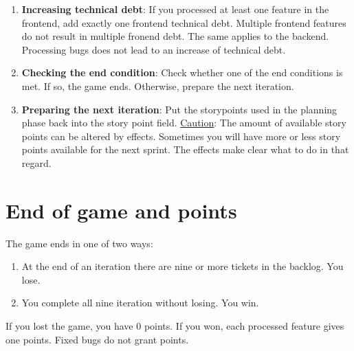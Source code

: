 \documentclass[a4paper, 11pt]{scrartcl}
\begin{document}
\begin{enumerate}
\begin{itemize}
    \end{itemize}
    \item \textbf{Increasing technical debt}: If you processed at least one feature in the frontend, add exactly one frontend technical debt. Multiple frontend features do not result in multiple fronend debt. The same applies to the backend. Processing bugs does not lead to an increase of technical debt.
    \item \textbf{Checking the end condition}: Check whether one of the end conditions is met. If so, the game ends. Otherwise, prepare the next iteration.
    \item \textbf{Preparing the next iteration}: Put the storypoints used in the planning phase back into the story point field. \underline{Caution}: The amount of available story points can be altered by effects. Sometimes you will have more or less story points available for the next sprint. The effects make clear what to do in that regard.
\end{enumerate}

\section*{End of game and points}

The game ends in one of two ways:

\begin{enumerate}
    \item At the end of an iteration there are nine or more tickets in the backlog. You lose.
    \item You complete all nine iteration without losing. You win.
\end{enumerate}

\noindent If you lost the game, you have 0 points. If you won, each processed feature gives one points. Fixed bugs do not grant points.
\end{document}

